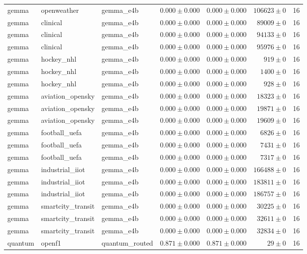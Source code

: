 \begin{table}[htbp]
\begin{tabular}{l l l r r r r}
gemma & openweather & gemma\_e4b & $0.000\pm0.000$ & $0.000\pm0.000$ & $106623\pm0$ & 16 \\
gemma & clinical & gemma\_e4b & $0.000\pm0.000$ & $0.000\pm0.000$ & $89009\pm0$ & 16 \\
gemma & clinical & gemma\_e4b & $0.000\pm0.000$ & $0.000\pm0.000$ & $94133\pm0$ & 16 \\
gemma & clinical & gemma\_e4b & $0.000\pm0.000$ & $0.000\pm0.000$ & $95976\pm0$ & 16 \\
gemma & hockey\_nhl & gemma\_e4b & $0.000\pm0.000$ & $0.000\pm0.000$ & $919\pm0$ & 16 \\
gemma & hockey\_nhl & gemma\_e4b & $0.000\pm0.000$ & $0.000\pm0.000$ & $1400\pm0$ & 16 \\
gemma & hockey\_nhl & gemma\_e4b & $0.000\pm0.000$ & $0.000\pm0.000$ & $928\pm0$ & 16 \\
gemma & aviation\_opensky & gemma\_e4b & $0.000\pm0.000$ & $0.000\pm0.000$ & $18323\pm0$ & 16 \\
gemma & aviation\_opensky & gemma\_e4b & $0.000\pm0.000$ & $0.000\pm0.000$ & $19871\pm0$ & 16 \\
gemma & aviation\_opensky & gemma\_e4b & $0.000\pm0.000$ & $0.000\pm0.000$ & $19609\pm0$ & 16 \\
gemma & football\_uefa & gemma\_e4b & $0.000\pm0.000$ & $0.000\pm0.000$ & $6826\pm0$ & 16 \\
gemma & football\_uefa & gemma\_e4b & $0.000\pm0.000$ & $0.000\pm0.000$ & $7431\pm0$ & 16 \\
gemma & football\_uefa & gemma\_e4b & $0.000\pm0.000$ & $0.000\pm0.000$ & $7317\pm0$ & 16 \\
gemma & industrial\_iiot & gemma\_e4b & $0.000\pm0.000$ & $0.000\pm0.000$ & $166488\pm0$ & 16 \\
gemma & industrial\_iiot & gemma\_e4b & $0.000\pm0.000$ & $0.000\pm0.000$ & $183811\pm0$ & 16 \\
gemma & industrial\_iiot & gemma\_e4b & $0.000\pm0.000$ & $0.000\pm0.000$ & $186757\pm0$ & 16 \\
gemma & smartcity\_transit & gemma\_e4b & $0.000\pm0.000$ & $0.000\pm0.000$ & $30225\pm0$ & 16 \\
gemma & smartcity\_transit & gemma\_e4b & $0.000\pm0.000$ & $0.000\pm0.000$ & $32611\pm0$ & 16 \\
gemma & smartcity\_transit & gemma\_e4b & $0.000\pm0.000$ & $0.000\pm0.000$ & $32834\pm0$ & 16 \\
quantum & openf1 & quantum\_routed & $0.871\pm0.000$ & $0.871\pm0.000$ & $29\pm0$ & 16 \\

\end{tabular}
\end{table}
